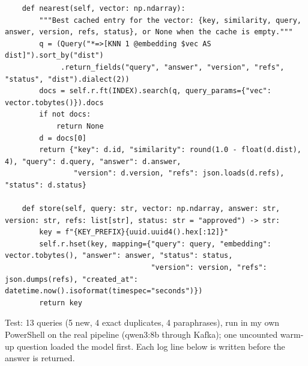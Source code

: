 \documentclass[11pt]{article}
\begin{document}
\endgroup
\begingroup\lstset{basicstyle=\ttfamily\tiny}
\begin{lstlisting}
    def nearest(self, vector: np.ndarray):
        """Best cached entry for the vector: {key, similarity, query, answer, version, refs, status}, or None when the cache is empty."""
        q = (Query("*=>[KNN 1 @embedding $vec AS dist]").sort_by("dist")
             .return_fields("query", "answer", "version", "refs", "status", "dist").dialect(2))
        docs = self.r.ft(INDEX).search(q, query_params={"vec": vector.tobytes()}).docs
        if not docs:
            return None
        d = docs[0]
        return {"key": d.id, "similarity": round(1.0 - float(d.dist), 4), "query": d.query, "answer": d.answer,
                "version": d.version, "refs": json.loads(d.refs), "status": d.status}

    def store(self, query: str, vector: np.ndarray, answer: str, version: str, refs: list[str], status: str = "approved") -> str:
        key = f"{KEY_PREFIX}{uuid.uuid4().hex[:12]}"
        self.r.hset(key, mapping={"query": query, "embedding": vector.tobytes(), "answer": answer, "status": status,
                                  "version": version, "refs": json.dumps(refs), "created_at": datetime.now().isoformat(timespec="seconds")})
        return key
\end{lstlisting}
\endgroup
Test: 13 queries (5 new, 4 exact duplicates, 4 paraphrases), run in my own PowerShell on the real pipeline (qwen3:8b through Kafka); one uncounted warm-up question loaded the model first. Each log line below is written before the answer is returned.
\end{document}
